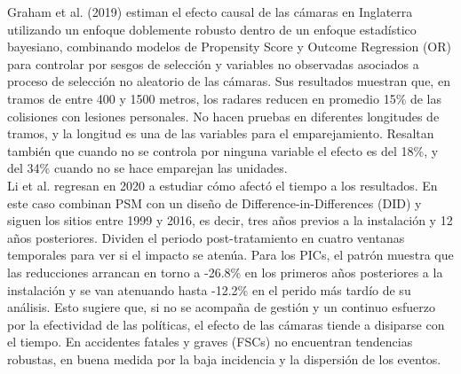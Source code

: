 
Graham et al. (2019) estiman el efecto causal de las cámaras en Inglaterra utilizando un enfoque doblemente robusto dentro de un enfoque estadístico bayesiano, combinando modelos de Propensity Score y Outcome Regression (OR) para controlar por sesgos de selección y variables no observadas asociados a proceso de selección no aleatorio de las cámaras. Sus resultados muestran que, en tramos de entre 400 y 1500 metros, los radares reducen en promedio 15\% de las colisiones con lesiones personales. No hacen pruebas en diferentes longitudes de tramos, y la longitud es una de las variables para el emparejamiento. Resaltan también que cuando no se controla por ninguna variable el efecto es del 18\%, y del 34\% cuando no se hace emparejan las unidades.\\ 

Li et al. regresan en 2020 a estudiar cómo afectó el tiempo a  los resultados. En este caso combinan PSM con un diseño de Difference-in-Differences (DID) y siguen los sitios entre 1999 y 2016, es decir, tres años previos a la instalación y 12 años posteriores. Dividen el periodo post-tratamiento en cuatro ventanas temporales para ver si el impacto se atenúa. Para los PICs, el patrón muestra que las reducciones arrancan en torno a -26.8\% en los primeros años posteriores a la instalación y se van atenuando hasta -12.2\% en el perido más tardío de su análisis. Esto sugiere que, si no se acompaña de gestión y un continuo esfuerzo por la efectividad de las políticas, el efecto de las cámaras tiende a disiparse con el tiempo. En accidentes fatales y graves (FSCs) no encuentran tendencias robustas, en buena medida por la baja incidencia y la dispersión de los eventos.\\ 


